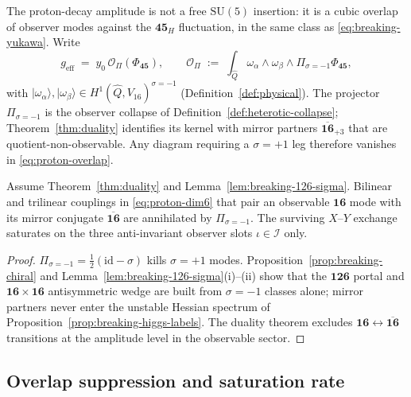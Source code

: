 The proton-decay amplitude is not a free $\mathrm{SU}(5)$ insertion: it is a
cubic overlap of observer modes against the $\mathbf{45}_H$ fluctuation, in
the same class as \eqref{eq:breaking-yukawa}. Write
\begin{equation}\label{eq:proton-overlap}
  g_{\mathrm{eff}}
  \;=\;
  y_0\,
  \mathcal{O}_{\Pi}\!\left(\Phi_{\mathbf{45}}\right),
  \qquad
  \mathcal{O}_{\Pi}
  \;:=\;
  \int_{\hat Q}
  \omega_\alpha \wedge \omega_\beta \wedge \Pi_{\sigma=-1}\Phi_{\mathbf{45}},
\end{equation}
with $|\omega_\alpha\rangle,|\omega_\beta\rangle\in
H^1(\hat Q,V_{16})^{\sigma=-1}$ (Definition~\ref{def:physical}). The projector
$\Pi_{\sigma=-1}$ is the observer collapse of
Definition~\ref{def:heterotic-collapse}; Theorem~\ref{thm:duality} identifies
its kernel with mirror partners $\overline{\mathbf{16}}_{+3}$ that are
quotient-non-observable. Any diagram requiring a $\sigma=+1$ leg therefore
vanishes in \eqref{eq:proton-overlap}.

\begin{lemma}\label{lem:proton-mirror}
Assume Theorem~\ref{thm:duality} and Lemma~\ref{lem:breaking-126-sigma}.
Bilinear and trilinear couplings in \eqref{eq:proton-dim6} that pair an
observable $\mathbf{16}$ mode with its mirror conjugate
$\overline{\mathbf{16}}$ are annihilated by $\Pi_{\sigma=-1}$. The surviving
$X$--$Y$ exchange saturates on the three anti-invariant observer slots
$\iota\in\mathcal{I}$ only.
\end{lemma}

\begin{proof}
$\Pi_{\sigma=-1}=\tfrac12(\mathrm{id}-\sigma)$ kills $\sigma=+1$ modes.
Proposition~\ref{prop:breaking-chiral} and
Lemma~\ref{lem:breaking-126-sigma}(i)--(ii) show that the $\mathbf{126}$
portal and $\mathbf{16}\times\mathbf{16}$ antisymmetric wedge are built from
$\sigma=-1$ classes alone; mirror partners never enter the unstable Hessian
spectrum of Proposition~\ref{prop:breaking-higgs-labels}. The duality theorem
excludes $\mathbf{16}\leftrightarrow\overline{\mathbf{16}}$ transitions at the
amplitude level in the observable sector.
\end{proof}

\subsection{Overlap suppression and saturation rate}
\label{sec:proton-decay:saturation}

